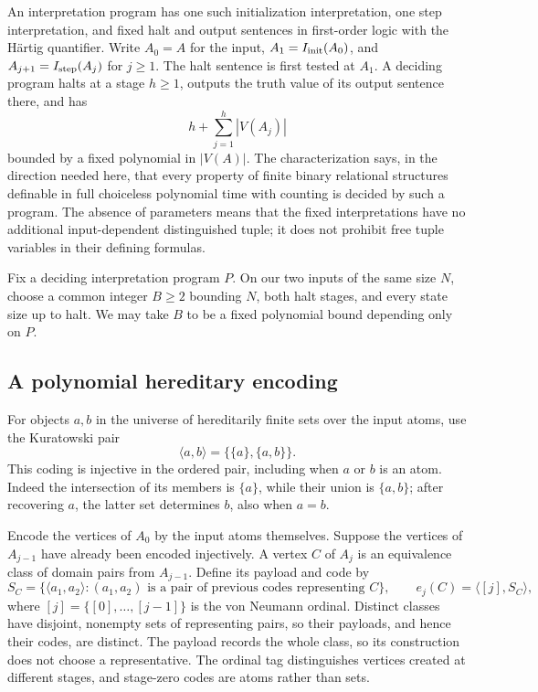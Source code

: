 An interpretation program has one such initialization interpretation, one
step interpretation, and fixed halt and output sentences in first-order
logic with the H\"artig quantifier. Write $A_0=A$ for the input,
$A_1=I_{\rm init}(A_0)$, and $A_{j+1}=I_{\rm step}(A_j)$ for $j\ge1$.
The halt sentence is first tested at $A_1$. A deciding program halts at a
stage $h\ge1$, outputs the truth value of its output sentence there, and has
\[
 h+\sum_{j=1}^{h}|V(A_j)|
\]
bounded by a fixed polynomial in $|V(A)|$. The characterization says, in the
direction needed here, that every property of finite binary relational
structures definable in full choiceless polynomial time with counting is
decided by such a program. The absence of parameters means that the fixed
interpretations have no additional input-dependent distinguished tuple;
it does not prohibit free tuple variables in their defining formulas.

Fix a deciding interpretation program $P$. On our two inputs of the same
size $N$, choose a common integer $B\ge2$ bounding $N$, both halt stages,
and every state size up to halt. We may take $B$ to be a fixed polynomial
bound depending only on $P$.

\subsection{A polynomial hereditary encoding}

For objects $a,b$ in the universe of hereditarily finite sets over the input
atoms, use the Kuratowski pair
\[
 \langle a,b\rangle=\{\{a\},\{a,b\}\}.
\]
This coding is injective in the ordered pair, including when $a$ or $b$ is
an atom. Indeed the intersection of its members is $\{a\}$, while their
union is $\{a,b\}$; after recovering $a$, the latter set determines $b$,
also when $a=b$.

Encode the vertices of $A_0$ by the input atoms themselves. Suppose the
vertices of $A_{j-1}$ have already been encoded injectively. A vertex $C$
of $A_j$ is an equivalence class of domain pairs from $A_{j-1}$. Define
its payload and code by
\[
 S_C=\{\langle a_1,a_2\rangle:
       (a_1,a_2)\text{ is a pair of previous codes representing }C\},
 \qquad
 e_j(C)=\langle [j],S_C\rangle,
\]
where $[j]=\{[0],\ldots,[j-1]\}$ is the von Neumann ordinal. Distinct
classes have disjoint, nonempty sets of representing pairs, so their
payloads, and hence their codes, are distinct. The payload records the
whole class, so its construction does not choose a representative. The ordinal tag distinguishes vertices created at
different stages, and stage-zero codes are atoms rather than sets.

